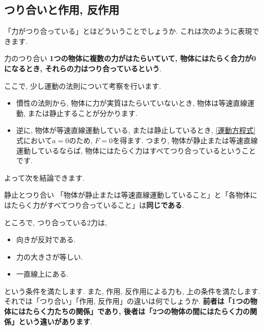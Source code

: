 \documentclass[11pt,dvipdfmx]{jsarticle}
\numberwithin{equation}{section} %
\begin{document}
\subsection{つり合いと作用, 反作用}
「力がつり合っている」とはどういうことでしょうか. これは次のように表現できます.
\begin{freebox}{力のつり合い}
    \textbf{1つの物体に複数の力がはたらいていて, 物体にはたらく合力が0になるとき, それらの力はつり合っているという}.
\end{freebox}
ここで, 少し運動の法則について考察を行います. 
\begin{itemize}
    \item 慣性の法則から, 物体に力が実質はたらいていないとき, 物体は等速直線運動, または静止することが分かります.
    \item 逆に, 物体が等速直線運動している, または静止しているとき, \eqref{運動方程式} 式において$a=0$のため, $F = 0$を得ます. つまり, 物体が静止または等速直線運動しているならば, 物体にはたらく力はすべてつり合っているということです.
\end{itemize}
よって次を結論できます.
\begin{freebox}{静止とつり合い}
「物体が静止または等速直線運動していること」と「各物体にはたらく力がすべてつり合っていること」は\textbf{同じである}.
\end{freebox}
ところで, つり合っている2力は, 
\begin{itemize}
    \item 向きが反対である.
    \item 力の大きさが等しい.
    \item 一直線上にある.
\end{itemize}
という条件を満たします. また, 作用, 反作用による力も, 上の条件を満たします. それでは「つり合い」「作用, 反作用」の違いは何でしょうか. \textbf{前者は「1つの物体にはたらく力たちの関係」であり, 後者は「2つの物体の間にはたらく力の関係」という違いがあります}. 
 
\end{document}
